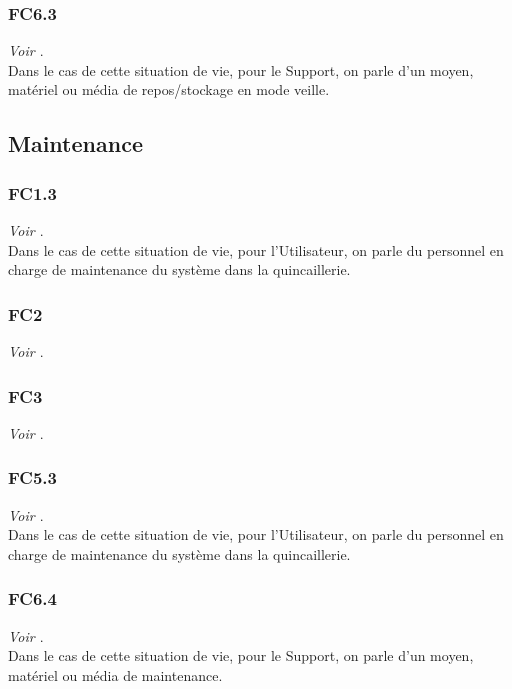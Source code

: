 \documentclass{article}
\begin{document}
\subsubsection{FC6.3}
\textit{Voir \hyperref[cat:fc6]{}}.
\medskip\\
Dans le cas de cette situation de vie, pour le Support, on parle d'un moyen,
matériel ou média de repos/stockage en mode veille.

\subsection{Maintenance}

\subsubsection{FC1.3}
\textit{Voir \hyperref[cat:fc1]{}}.
\medskip\\
Dans le cas de cette situation de vie, pour l'Utilisateur, on parle du personnel
en charge de maintenance du système dans la quincaillerie.

\subsubsection{FC2}
\textit{Voir \hyperref[cat:fc2]{}}.

\subsubsection{FC3}
\textit{Voir \hyperref[cat:fc3]{}}.

\subsubsection{FC5.3}
\textit{Voir \hyperref[cat:fc5]{}}.
\medskip\\
Dans le cas de cette situation de vie, pour l'Utilisateur, on parle du personnel
en charge de maintenance du système dans la quincaillerie.

\subsubsection{FC6.4}
\textit{Voir \hyperref[cat:fc6]{}}.
\medskip\\
Dans le cas de cette situation de vie, pour le Support, on parle d'un moyen,
matériel ou média de maintenance.
\end{document}
